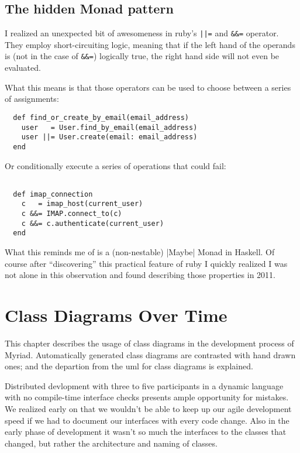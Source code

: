 \section{The hidden Monad pattern}

I realized an unexpected bit of awesomeness in \gls{ruby}'s \lstinline{||=} and \lstinline{&&=} operator. They employ short-circuiting logic, meaning that if the left hand of the operands is (not in the case of \lstinline{&&=}) logically true, the right hand side will not even be evaluated.

What this means is that those operators can be used to choose between a series of assignments:

\begin{lstlisting}
  def find_or_create_by_email(email_address)
    user   = User.find_by_email(email_address)
    user ||= User.create(email: email_address)
  end
\end{lstlisting}

Or conditionally execute a series of operations that could fail:

\begin{lstlisting}

  def imap_connection
    c   = imap_host(current_user)
    c &&= IMAP.connect_to(c)
    c &&= c.authenticate(current_user)
  end

\end{lstlisting}

What this reminds me of is a (non-nestable) |Maybe| Monad in Haskell. Of course after ``discovering'' this practical feature of \gls{ruby} I quickly realized I was not alone in this observation and found \citet{rubymonads} describing those properties in 2011.

\chapter{Class Diagrams Over Time}
\label{chapter:UMLDiagrams}

This chapter describes the usage of class diagrams in the development process of Myriad. Automatically generated class diagrams are contrasted with hand drawn ones; and the departion from the \gls{uml} for class diagrams is explained.

Distributed devlopment with three to five participants in a dynamic language with no compile-time interface checks presents ample opportunity for mistakes. We realized early on that we wouldn't be able to keep up our agile development speed if we had to document our interfaces with every code change. Also in the early phase of development it wasn't so much the interfaces to the classes that changed, but rather the architecture and naming of classes.


